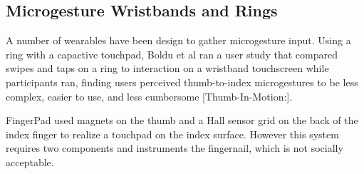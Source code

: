\documentclass [11pt, proquest] {uwthesis}[2020/02/24]
\begin{document}
\subsection{Microgesture Wristbands and Rings}

A number of wearables have been design to gather microgesture input. Using a ring with a capactive touchpad, Boldu et al ran a user study that compared swipes and taps on a ring to interaction on a wristband touchscreen while participants ran, finding users perceived thumb-to-index microgestures to be less complex, easier to use, and less cumbersome [Thumb-In-Motion:]. 

FingerPad used magnets on the thumb and a Hall sensor grid on the back of the index finger to realize a touchpad on the index surface. However this system requires two components and instruments the fingernail, which is not socially acceptable. 


\end{document}
